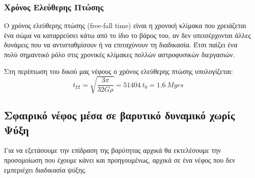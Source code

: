 	
	\subsubsection{Χρόνος Ελεύθερης Πτώσης}
	Ο χρόνος ελεύθερης πτώσης (free-fall time) είναι η χρονική κλίμακα που χρειάζεται ένα σώμα να καταρρεύσει κάτω από το ίδιο το βάρος του, αν δεν υπεισέρχονται άλλες δυνάμεις που να αντισταθμίσουν ή να επιταχύνουν τη διαδικασία. Έτσι παίζει ένα πολύ σημαντικό ρόλο στις χρονικές κλίμακες πολλών αστροφυσικών διεργασιών.
	
	Στη περίπτωση του δικού μας νέφους ο χρόνος ελεύθερης πτώσης υπολογίζεται:
	\begin{equation}
		t_\texttt{ff}=\sqrt{\frac{3\pi}{32G\rho}} = \SI{51404}{t_0} = \SI{1.6}{Myrs}
	\end{equation}
	
	\subsection{Σφαιρικό νέφος μέσα σε βαρυτικό δυναμικό χωρίς Ψύξη}
	
	Για να εξετάσουμε την επίδραση της βαρύτητας αρχικά θα εκτελέσουμε την προσομοίωση που έχουμε κάνει και προηγουμένως, αρχικά σε ένα νέφος που δεν εμπεριέχει διαδικασία ψύξης.
	
